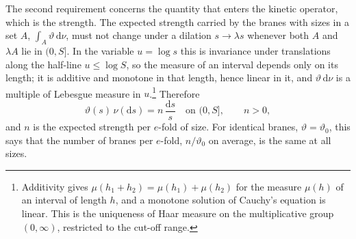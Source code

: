 \documentclass[aps,prd,10pt,twocolumn,superscriptaddress,nofootinbib,floatfix,longbibliography]{revtex4-2}
\newcommand{\dd}{\mathrm{d}}
\begin{document}
The second requirement concerns the quantity that enters the kinetic operator, which is the strength. The expected strength carried by the branes with sizes in a set $A$, $\int_A\vartheta\,\dd\nu$, must not change under a dilation $s\to\lambda s$ whenever both $A$ and $\lambda A$ lie in $(0,S]$. In the variable $u=\log s$ this is invariance under translations along the half-line $u\le\log S$, so the measure of an interval depends only on its length; it is additive and monotone in that length, hence linear in it, and $\vartheta\,\dd\nu$ is a multiple of Lebesgue measure in $u$.\footnote{Additivity gives $\mu(h_1+h_2)=\mu(h_1)+\mu(h_2)$ for the measure $\mu(h)$ of an interval of length $h$, and a monotone solution of Cauchy's equation is linear. This is the uniqueness of Haar measure on the multiplicative group $(0,\infty)$, restricted to the cut-off range.} Therefore
\begin{equation}
\label{eq:intensity}
\vartheta(s)\,\nu(\dd s)=n\,\frac{\dd s}{s}\quad\text{on }(0,S],\qquad n>0 ,
\end{equation}
and $n$ is the expected strength per $e$-fold of size. For identical branes, $\vartheta=\vartheta_0$, this says that the number of branes per $e$-fold, $n/\vartheta_0$ on average, is the same at all sizes.
\end{document}
